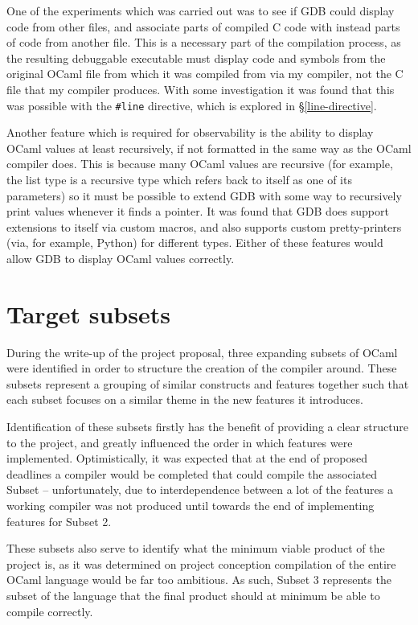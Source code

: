 \documentclass[12pt,a4paper,twoside,openright]{report}
\begin{document}
One of the experiments which was carried out was to see if GDB could display
code from other files, and associate parts of compiled C code with instead parts
of code from another file. This is a necessary part of the compilation process,
as the resulting debuggable executable must display code and symbols from the
original OCaml file from which it was compiled from via my compiler, not the C
file that my compiler produces. With some investigation it was found that this
was possible with the \texttt{\#}\texttt{line} directive, which is explored in
\S\ref{line-directive}.

Another feature which is required for observability is the ability to display 
OCaml values at least recursively, if not formatted in the same way as the 
OCaml compiler does. This is because many OCaml values are recursive (for 
example, the list type is a recursive type which refers back to itself as one 
of its parameters) so it must be possible to extend GDB with some way to 
recursively print values whenever it finds a pointer. It was found that GDB 
does support extensions to itself via custom macros, and also supports custom 
pretty-printers (via, for example, Python) for different types. Either of these 
features would allow GDB to display OCaml values correctly.

\section{Target subsets}

During the write-up of the project proposal, three expanding subsets of OCaml 
were identified in order to structure the creation of the compiler around. 
These subsets represent a grouping of similar constructs and features together 
such that each subset focuses on a similar theme in the new features it 
introduces.

Identification of these subsets firstly has the benefit of providing a clear 
structure to the project, and greatly influenced the order in which features 
were implemented. Optimistically, it was expected that at the end of proposed 
deadlines a compiler would be completed that could compile the associated 
Subset -- unfortunately, due to interdependence between a lot of the features a 
working compiler was not produced until towards the end of implementing 
features for Subset 2.

These subsets also serve to identify what the minimum viable product of the 
project is, as it was determined on project conception compilation of the 
entire OCaml language would be far too ambitious. As such, Subset 3 represents 
the subset of the language that the final product should at minimum be able to 
compile correctly.
\end{document}
